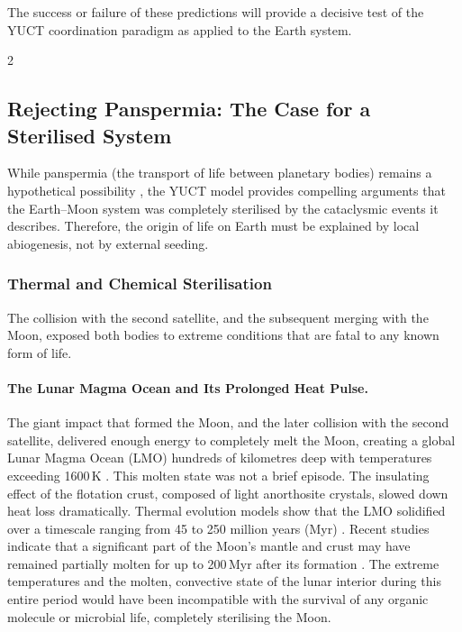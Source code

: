 \documentclass[11pt,a4paper]{article}
\begin{document}
	The success or failure of these predictions will provide a decisive test
	of the YUCT coordination paradigm as applied to the Earth system.
	
	\begin{multicols}{2}
		
		\subsection{Rejecting Panspermia: The Case for a Sterilised System}
		
		While panspermia (the transport of life between planetary bodies) remains a 
		hypothetical possibility \cite{PanspermiaReview}, the YUCT model provides 
		compelling arguments that the Earth–Moon system was completely sterilised by the 
		cataclysmic events it describes. Therefore, the origin of life on Earth must be 
		explained by local abiogenesis, not by external seeding.
		
		\subsubsection{Thermal and Chemical Sterilisation}
		
		The collision with the second satellite, and the subsequent merging with the Moon, exposed both bodies to extreme conditions that are fatal to any known form of life.
		
		\paragraph{The Lunar Magma Ocean and Its Prolonged Heat Pulse.}
		The giant impact that formed the Moon, and the later collision with the second satellite, delivered enough energy to completely melt the Moon, creating a global Lunar Magma Ocean (LMO) hundreds of kilometres deep with temperatures exceeding 1600 K \cite{Sahijpal2020}. This molten state was not a brief episode. The insulating effect of the flotation crust, composed of light anorthosite crystals, slowed down heat loss dramatically. Thermal evolution models show that the LMO solidified over a timescale ranging from 45 to 250 million years (Myr) \cite{Colin2024, Maurice2018}. Recent studies indicate that a significant part of the Moon's mantle and crust may have remained partially molten for up to 200 Myr after its formation \cite{Maurice2020}. The extreme temperatures and the molten, convective state of the lunar interior during this entire period would have been incompatible with the survival of any organic molecule or microbial life, completely sterilising the Moon.
		

\end{multicols}
\end{document}
